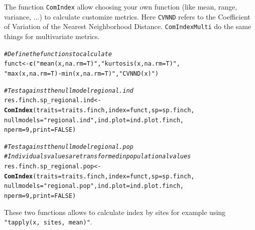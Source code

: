\documentclass[12pt]{article}\usepackage[]{graphicx}\usepackage[]{color}
\makeatletter
\newcommand{\hlnum}[1]{\textcolor[rgb]{0.686,0.059,0.569}{#1}}%
\newcommand{\hlstr}[1]{\textcolor[rgb]{0.192,0.494,0.8}{#1}}%
\newcommand{\hlcom}[1]{\textcolor[rgb]{0.678,0.584,0.686}{\textit{#1}}}%
\newcommand{\hlstd}[1]{\textcolor[rgb]{0.345,0.345,0.345}{#1}}%
\newcommand{\hlkwb}[1]{\textcolor[rgb]{0.69,0.353,0.396}{#1}}%
\newcommand{\hlkwc}[1]{\textcolor[rgb]{0.333,0.667,0.333}{#1}}%
\newcommand{\hlkwd}[1]{\textcolor[rgb]{0.737,0.353,0.396}{\textbf{#1}}}%
\newenvironment{kframe}{%
 \def\at@end@of@kframe{}%
 \ifinner\ifhmode%
  \def\at@end@of@kframe{\end{minipage}}%
  \begin{minipage}{\columnwidth}%
 \fi\fi%
 \def\FrameCommand##1{\hskip\@totalleftmargin \hskip-\fboxsep
 \colorbox{shadecolor}{##1}\hskip-\fboxsep
     \hskip-\linewidth \hskip-\@totalleftmargin \hskip\columnwidth}%
 \MakeFramed {\advance\hsize-\width
   \@totalleftmargin\z@ \linewidth\hsize
   \@setminipage}}%
 {\par\unskip\endMakeFramed%
 \at@end@of@kframe}
\newenvironment{knitrout}{}{} %
\newcommand{\code}[1]{{{\tt #1}}}
\makeatother
\begin{document}
The function \texttt{ComIndex} allow choosing your own function (like mean, range, variance, ...) to calculate customize metrics. Here \texttt{CVNND} refers to the Coefficient of Variation of the Nearest Neighborhood Distance. \texttt{ComIndexMulti} do the same things for multivariate metrics. 

\begin{knitrout}
\color{fgcolor}\begin{kframe}
\begin{alltt}
\hlcom{#Define the function s to calculate}
\hlstd{funct}\hlkwb{<-}\hlkwd{c}\hlstd{(}\hlstr{"mean(x, na.rm = T)"}\hlstd{,} \hlstr{"kurtosis(x, na.rm = T)"}\hlstd{,}
     \hlstr{"max(x, na.rm = T) - min(x, na.rm = T)"}\hlstd{,} \hlstr{"CVNND(x)"} \hlstd{)}

\hlcom{#Test against the null model regional.ind}
\hlstd{res.finch.sp_regional.ind}\hlkwb{<-}\hlkwd{ComIndex}\hlstd{(}\hlkwc{traits} \hlstd{= traits.finch,} \hlkwc{index} \hlstd{= funct,} \hlkwc{sp} \hlstd{= sp.finch,}
                           \hlkwc{nullmodels} \hlstd{=} \hlstr{"regional.ind"}\hlstd{,} \hlkwc{ind.plot} \hlstd{= ind.plot.finch,}
                            \hlkwc{nperm} \hlstd{=} \hlnum{9}\hlstd{,} \hlkwc{print} \hlstd{=} \hlnum{FALSE}\hlstd{)}

\hlcom{#Test against the null model regional.pop}
\hlcom{#Individuals values are transformed in populational values}
\hlstd{res.finch.sp_regional.pop}\hlkwb{<-}\hlkwd{ComIndex}\hlstd{(}\hlkwc{traits} \hlstd{= traits.finch,} \hlkwc{index} \hlstd{= funct,} \hlkwc{sp} \hlstd{= sp.finch,}
               \hlkwc{nullmodels} \hlstd{=} \hlstr{"regional.pop"}\hlstd{,} \hlkwc{ind.plot} \hlstd{= ind.plot.finch,}
               \hlkwc{nperm} \hlstd{=} \hlnum{9}\hlstd{,} \hlkwc{print} \hlstd{=} \hlnum{FALSE}\hlstd{)}
\end{alltt}
\end{kframe}
\end{knitrout}

These two functions allows to calculate  index by sites for example using \code{"tapply(x, sites, mean)"}.
\end{document}
